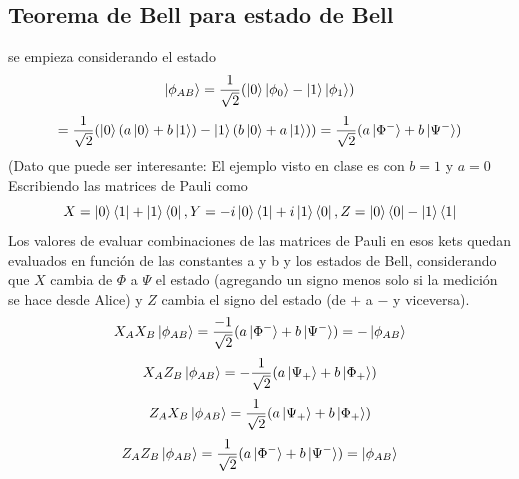 \documentclass{book}
\begin{document}
\subsection{Teorema de Bell para estado de Bell}se empieza considerando el estado
$$\ket{\phi_{AB}}=\frac{1}{\sqrt{2}}(\ket{0}\ket{\phi_0}-\ket{1}\ket{\phi_1})$$ $$= \frac{1}{\sqrt{2}}(\ket{0}(a\ket{0}+b\ket{1})-\ket{1}(b\ket{0}+a\ket{1}))=\frac{1}{\sqrt{2}}(a\ket{\Phi^-}+b\ket{\Psi^-})$$ 
(Dato que puede ser interesante: El ejemplo visto en clase es con $b=1$ y $a=0$
Escribiendo las matrices de Pauli como
$$ X=\ket{0}\bra{1}+\ket{1}\bra{0}, Y=-i\ket{0}\bra{1}+i\ket{1}\bra{0}, Z=\ket{0}\bra{0}-\ket{1}\bra{1}$$
Los valores de evaluar combinaciones de las matrices de Pauli en esos kets quedan evaluados en función de las constantes a y b y los estados de Bell, considerando que $X$ cambia de $\Phi$ a $\Psi$ el estado (agregando un signo menos solo si la medición se hace desde Alice) y $Z$ cambia el signo del estado (de $+$ a $-$ y viceversa).
$$ X_AX_B\ket{\phi_{AB}}=\frac{-1}{\sqrt{2}}(a\ket{\Phi^-}+b\ket{\Psi^-})=-\ket{\phi_{AB}}$$
$$ X_AZ_B\ket{\phi_{AB}}=-\frac{1}{\sqrt{2}}(a\ket{\Psi_+}+b\ket{\Phi_+})$$
$$ Z_AX_B\ket{\phi_{AB}}=\frac{1}{\sqrt{2}}(a\ket{\Psi_+}+b\ket{\Phi_+})$$
$$ Z_AZ_B\ket{\phi_{AB}}=\frac{1}{\sqrt{2}}(a\ket{\Phi^-}+b\ket{\Psi^-})=\ket{\phi_{AB}}$$
\end{document}
